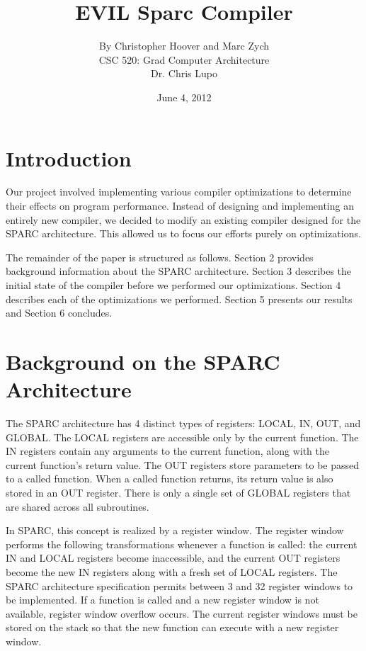\documentclass[12pt]{article}
\begin{document}
\title{EVIL Sparc Compiler}

\author{
By Christopher Hoover and Marc Zych \vspace{10pt} \\
CSC 520: Grad Computer Architecture \vspace{10pt} \\
Dr. Chris Lupo \vspace{10pt} \\
}
\date{June 4, 2012}

\maketitle

\vfill

\thispagestyle{empty}
\newpage

\tableofcontents
\newpage

\section{Introduction}
Our project involved implementing various compiler optimizations to determine their effects on program performance.
Instead of designing and implementing an entirely new compiler, we decided to modify an existing compiler designed for the SPARC architecture.
This allowed us to focus our efforts purely on optimizations.

The remainder of the paper is structured as follows.
Section 2 provides background information about the SPARC architecture.
Section 3 describes the initial state of the compiler before we performed our optimizations.
Section 4 describes each of the optimizations we performed.
Section 5 presents our results and Section 6 concludes.

\section{Background on the SPARC Architecture}
The SPARC architecture has 4 distinct types of registers: LOCAL, IN, OUT, and GLOBAL.
The LOCAL registers are accessible only by the current function.
The IN registers contain any arguments to the current function, along with the current function's return value.
The OUT registers store parameters to be passed to a called function.
When a called function returns, its return value is also stored in an OUT register.
There is only a single set of GLOBAL registers that are shared across all subroutines.

In SPARC, this concept is realized by a register window.
The register window performs the following transformations whenever a function is called: the current IN and LOCAL registers become inaccessible, and the current OUT registers become the new IN registers along with a fresh set of LOCAL registers.
The SPARC architecture specification permits between 3 and 32 register windows to be implemented.
If a function is called and a new register window is not available, register window overflow occurs.
The current register windows must be stored on the stack so that the new function can execute with a new register window.
\end{document}
